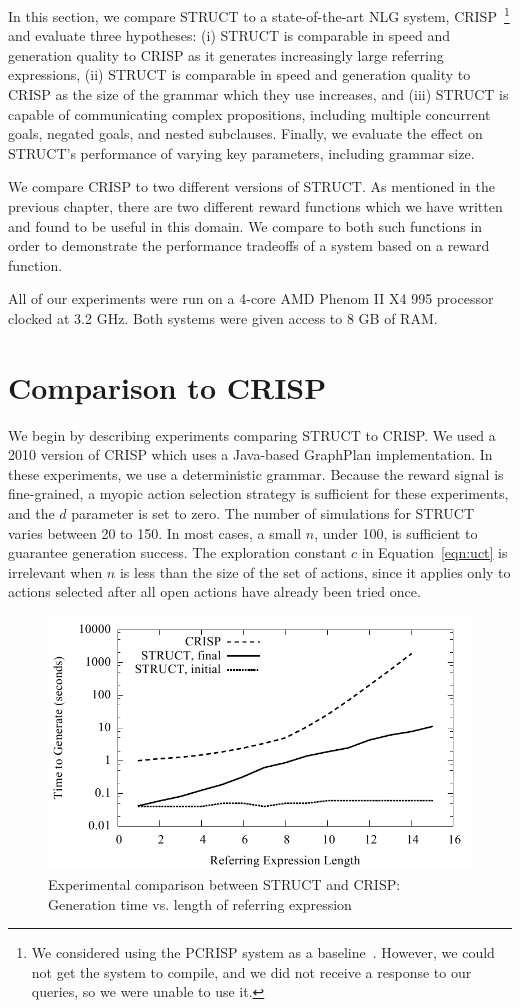 In this section, we compare STRUCT to a state-of-the-art NLG system,
CRISP~\footnote{We considered using the PCRISP system as a
  baseline~\cite{bauer_sentence_2010}. However, we could not get the system to
  compile, and we did not receive a response to our queries, so we were
  unable to use it.}
and evaluate three hypotheses: (i) STRUCT is
comparable in speed and generation quality to CRISP as it generates
increasingly large referring expressions, (ii) STRUCT is
comparable in speed and generation quality to CRISP as the size of the
grammar which they use increases, and (iii) STRUCT is capable of
communicating complex propositions, including multiple concurrent
goals, negated goals, and nested subclauses.
Finally, we evaluate the effect on STRUCT's performance 
of varying key parameters, including grammar size.

We compare CRISP to two different versions of STRUCT.
As mentioned in the previous chapter, there are two different reward
functions which we have written and found to be useful in this
domain.  We compare to both such functions in order to demonstrate
the performance tradeoffs of a system based on a reward function.

All of our experiments were run on a 4-core AMD Phenom II X4 995 processor
clocked at 3.2 GHz.  Both systems were given access to 8 GB of RAM.

\section{Comparison to CRISP}

We begin by describing experiments comparing STRUCT to CRISP. We used a
2010 version of CRISP  which uses a Java-based GraphPlan
implementation. In these
experiments, we use a deterministic grammar.
Because the reward signal is fine-grained,
 a myopic action selection strategy is
sufficient for these experiments, and 
the $d$ parameter is set to zero. The
number of simulations for STRUCT varies between 20 to 150.
In most cases, a small $n$, under 100, is sufficient
to guarantee generation success.  The exploration constant $c$ in
Equation~\ref{eqn:uct} is irrelevant when $n$ is less than the size
of the set of actions, since it
applies only to actions selected after all open actions have already
been tried once.

\begin{figure}
\centering
\includegraphics[width=0.7 \linewidth ]{../analysis/plots/complex-goal/complex-goal.pdf}
\caption{Experimental comparison between STRUCT and  CRISP: 
Generation time vs. length of referring expression }
\label{crisp-comparison-gentime}
\end{figure}

